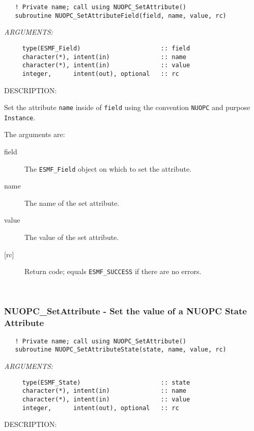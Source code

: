 \begin{verbatim}   ! Private name; call using NUOPC_SetAttribute()
   subroutine NUOPC_SetAttributeField(field, name, value, rc)\end{verbatim}{\em ARGUMENTS:}
\begin{verbatim}     type(ESMF_Field)                      :: field
     character(*), intent(in)              :: name
     character(*), intent(in)              :: value
     integer,      intent(out), optional   :: rc\end{verbatim}
{\sf DESCRIPTION:\\ }


     Set the attribute {\tt name} inside of {\tt field} using the
     convention {\tt NUOPC} and purpose {\tt Instance}.
  
     The arguments are:
     \begin{description}
     \item[field]
       The {\tt ESMF\_Field} object on which to set the attribute.
     \item[name]
       The name of the set attribute.
     \item[value]
       The value of the set attribute.
     \item[{[rc]}]
       Return code; equals {\tt ESMF\_SUCCESS} if there are no errors.
     \end{description}
   
 
\mbox{}\hrulefill\ 
 
\subsubsection [NUOPC\_SetAttribute] {NUOPC\_SetAttribute - Set the value of a NUOPC State Attribute}


\begin{verbatim}   ! Private name; call using NUOPC_SetAttribute()
   subroutine NUOPC_SetAttributeState(state, name, value, rc)\end{verbatim}{\em ARGUMENTS:}
\begin{verbatim}     type(ESMF_State)                      :: state
     character(*), intent(in)              :: name
     character(*), intent(in)              :: value
     integer,      intent(out), optional   :: rc\end{verbatim}
{\sf DESCRIPTION:\\ }



